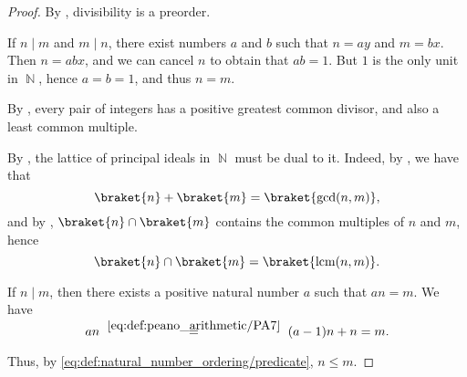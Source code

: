 \begin{proof}
  By , divisibility is a preorder.

   If \( n \mid m \) and \( m \mid n \), there exist numbers \( a \) and \( b \) such that \( n = ay \) and \( m = bx \). Then \( n = abx \), and we can cancel \( n \) to obtain that \( ab = 1 \). But \( 1 \) is the only unit in \( \BbbN \), hence \( a = b = 1 \), and thus \( n = m \).

   By , every pair of integers has a positive greatest common divisor, and also a least common multiple.

  By , the lattice of principal ideals in \( \BbbN \) must be dual to it. Indeed, by , we have that
  \begin{equation*}
    \braket{n} + \braket{m} = \braket{ \gcd(n, m) },
  \end{equation*}
  and by , \( \braket{n} \cap \braket{m} \) contains the common multiples of \( n \) and \( m \), hence
  \begin{equation*}
    \braket{n} \cap \braket{m} = \braket{ \lcm(n, m) }.
  \end{equation*}

   If \( n \mid m \), then there exists a positive natural number \( a \) such that \( an = m \). We have
  \begin{equation*}
    an
    \reloset{\eqref{eq:def:peano_arithmetic/PA7}} =
    (a - 1)n + n
    =
    m.
  \end{equation*}

  Thus, by \eqref{eq:def:natural_number_ordering/predicate}, \( n \leq m \).
\end{proof}


